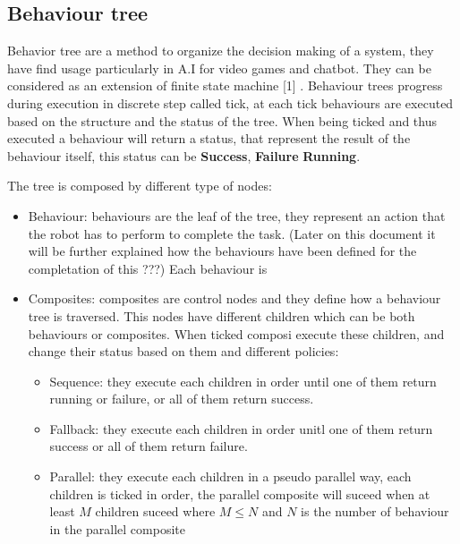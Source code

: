 \subsection*{Behaviour tree}
Behavior tree are a method to organize the decision making of a system, they have find usage particularly in A.I for
video games and chatbot. They can be considered as an extension of finite state machine [1] . 
Behaviour trees progress during execution in discrete step called tick, at each tick behaviours are executed based on
the structure and the status of the tree. When being ticked and thus executed a behaviour will return a status, that 
represent the result of the behaviour itself, this status can be \textbf{Success}, \textbf{Failure} \textbf{Running}.

The tree is  composed by different type of nodes: 
\begin{itemize}
    \item Behaviour: behaviours are the leaf of the tree, they represent an action that the robot has to perform 
                     to complete the task. (Later on this document it will be further explained how the behaviours have
                     been defined for the completation of this ???)
                     Each behaviour is 
    \item Composites: composites are control nodes and they define how a behaviour tree is traversed. This nodes have 
                      different children which can be both behaviours or composites. When ticked composi execute these
                      children, and change their status based on them and different policies:
                      \begin{itemize}
                        \item Sequence: they execute each children in order until one of them return running or failure, 
                                        or all of them return success.
                        \item Fallback: they execute each children in order unitl one of them return success or all 
                                        of them return failure.
                        \item Parallel: they execute each children in a pseudo parallel way, each children is ticked in 
                                        order, the parallel composite will suceed when at least $M$ children suceed where 
                                        $M \leq N$ and $N$ is the number of behaviour in the parallel composite
                      \end{itemize}
\end{itemize} 
